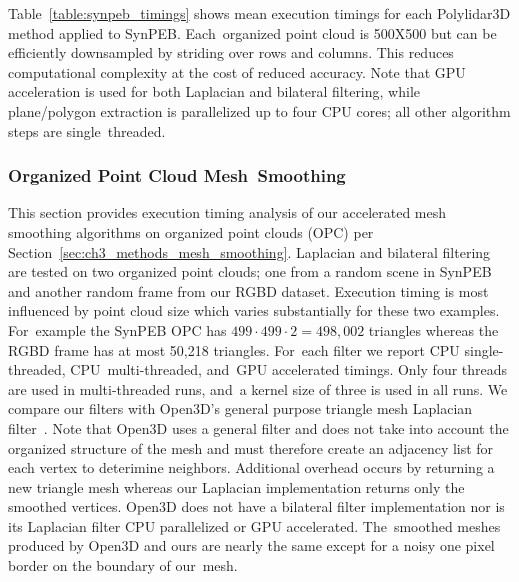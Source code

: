 Table~\ref{table:synpeb_timings} shows mean execution timings for each Polylidar3D method applied to SynPEB.  Each~organized point cloud is 500X500 but can be efficiently downsampled by striding over rows and columns. This reduces computational complexity at the cost of reduced accuracy. Note that GPU acceleration is used for both Laplacian and bilateral filtering, while plane/polygon extraction is parallelized up to four CPU cores; all other algorithm steps are single~threaded. 

\begin{table}[H]
\centering
\caption{Mean Execution Timings (ms) and Accuracy of Polylidar3D on~SynPEB.}
\label{table:synpeb_timings}
\end{table}
\unskip


\subsubsection{Organized Point Cloud Mesh~Smoothing}

This section provides execution timing analysis of our accelerated mesh smoothing algorithms on organized point clouds (OPC) per Section~\ref{sec:ch3_methods_mesh_smoothing}. Laplacian and bilateral filtering are tested on two organized point clouds; one from a random scene in SynPEB and another random frame from our RGBD dataset.  Execution timing is most influenced by point cloud size which varies substantially for these two examples. For~example the SynPEB OPC has $499 \cdot 499 \cdot 2 = 498,002$ triangles whereas the RGBD frame has at most 50,218 triangles. For~each filter we report CPU single-threaded, CPU~multi-threaded, and~GPU accelerated timings. Only four threads are used in multi-threaded runs, and~a kernel size of three is used in all runs. We compare our filters with Open3D's general purpose triangle mesh Laplacian filter~\cite{zhou_open3d_2018}. Note that Open3D uses a general filter and does not take into account the organized structure of the mesh and must therefore create an adjacency list for each vertex to deterimine neighbors. Additional overhead occurs by returning a new triangle mesh whereas our Laplacian implementation returns only the smoothed vertices. Open3D does not have a bilateral filter implementation nor is its Laplacian filter CPU parallelized or GPU accelerated. The~smoothed meshes produced by Open3D and ours are nearly the same except for a noisy one pixel border on the boundary of our~mesh.  

